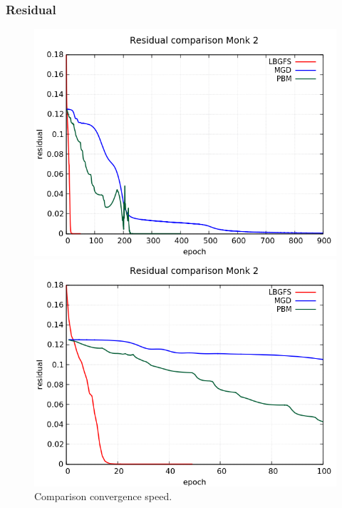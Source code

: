 \subsubsection{Residual}
\begin{figure}[H]
	\centering
	\begin{minipage}[t]{0.5\linewidth}
		\includegraphics[width=\linewidth]{img/Monk2_R_Comparison_standard.png}
	\end{minipage}%
	\begin{minipage}[t]{0.5\linewidth}
		\includegraphics[width=\linewidth]{img/Monk2_R_Comparison_zoom.png}
	\end{minipage}
	\caption{Comparison convergence speed.}
\end{figure}
